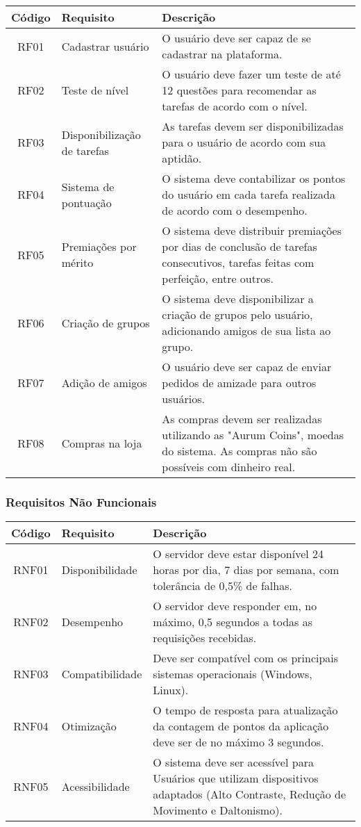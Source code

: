 \documentclass[
	article,			%
	12pt,				%
	oneside,			%
	a4paper,			%
	english,			%
	brazil,				%
	sumario=tradicional
	]{abntex2}
\begin{document}
\begin{center}
\begin{tabular}{|c|l|p{6cm}|}
\hline
\textbf{Código} & \textbf{Requisito} & \textbf{Descrição} \\
\hline
RF01 & Cadastrar usuário & O usuário deve ser capaz de se cadastrar na plataforma.\\
\hline
RF02 & Teste de nível & O usuário deve fazer um teste de até 12 questões para recomendar as tarefas de acordo com o nível.\\
\hline
RF03 & Disponibilização de tarefas & As tarefas devem ser disponibilizadas para o usuário de acordo com sua aptidão. \\
\hline
RF04 & Sistema de pontuação & O sistema deve contabilizar os pontos do usuário em cada tarefa realizada de acordo com o desempenho. \\
\hline
RF05 & Premiações por mérito & O sistema deve distribuir premiações por dias de conclusão de tarefas consecutivos, tarefas feitas com perfeição, entre outros. \\
\hline
RF06 & Criação de grupos & O sistema deve disponibilizar a criação de grupos pelo usuário, adicionando amigos de sua lista ao grupo. \\
\hline
RF07 & Adição de amigos & O usuário deve ser capaz de enviar pedidos de amizade para outros usuários. \\
\hline
RF08 & Compras na loja & As compras devem ser realizadas utilizando as "Aurum Coins", moedas do sistema. As compras não são possíveis com dinheiro real. \\
\hline
\end{tabular}
\end{center}


\subsubsection{Requisitos Não Funcionais}

\begin{center}
\vspace{-0.0cm}

\begin{tabular}{|c|l|p{8cm}|}
\hline
\textbf{Código} & \textbf{Requisito} & \textbf{Descrição} \\
\hline
RNF01 & Disponibilidade & O servidor deve estar disponível 24 horas por dia, 7 dias por semana, com tolerância de 0,5\% de falhas. \\
\hline
RNF02 & Desempenho & O servidor deve responder em, no máximo, 0,5 segundos a todas as requisições recebidas. \\
\hline
RNF03 & Compatibilidade & Deve ser compatível com os principais sistemas operacionais (Windows, Linux). \\
\hline
RNF04 & Otimização & O tempo de resposta para atualização da contagem de pontos da aplicação deve ser de no máximo 3 segundos. \\
\hline
RNF05 & Acessibilidade & O sistema deve ser acessível para Usuários que utilizam dispositivos adaptados (Alto Contraste, Redução de Movimento e Daltonismo). \\
\hline
\end{tabular}
\end{center}
\end{document}
